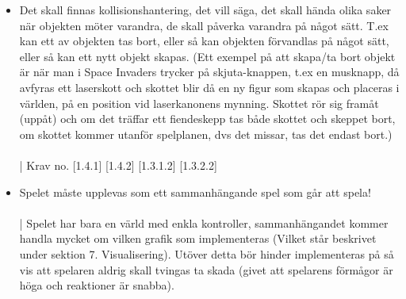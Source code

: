 \documentclass{TDP005mall}
\begin{document}
\begin{itemize}
    \item Det skall finnas kollisionshantering, det vill säga, det skall hända olika saker när objekten möter varandra, de skall påverka varandra på något sätt. T.ex kan ett av objekten tas bort, eller så kan objekten förvandlas på något sätt, eller så kan ett nytt objekt skapas. (Ett exempel på att skapa/ta bort objekt är när man i Space Invaders trycker på skjuta-knappen, t.ex en musknapp, då avfyras ett laserskott och skottet blir då en ny figur som skapas och placeras i världen, på en position vid laserkanonens mynning. Skottet rör sig framåt (uppåt) och om det träffar ett fiendeskepp tas både skottet och skeppet bort, om skottet kommer utanför spelplanen, dvs det missar, tas det endast bort.)\\
    \\| Krav no. [1.4.1] [1.4.2] [1.3.1.2] [1.3.2.2]\\

    \item Spelet måste upplevas som ett sammanhängande spel som går att spela!\\
    \\| Spelet har bara en värld med enkla kontroller, sammanhängandet kommer handla mycket om vilken grafik som implementeras (Vilket står beskrivet under sektion 7. Visualisering). Utöver detta bör hinder implementeras på så vis att spelaren aldrig skall tvingas ta skada (givet att spelarens förmågor är höga
     och reaktioner är snabba). \\
\end{itemize}
\end{document}
